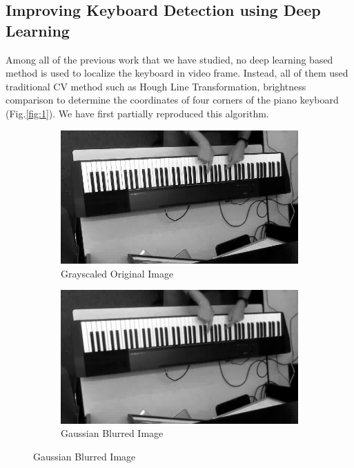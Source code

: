 \documentclass[10pt,twocolumn,letterpaper]{article}
\begin{document}
\subsection{Improving Keyboard Detection using Deep Learning}

Among all of the previous work that we have studied, no deep learning based method is used to localize the keyboard in video frame. Instead, all of them used traditional CV method such as Hough Line Transformation, brightness comparison to determine the coordinates of four corners of the piano keyboard (Fig.\ref{fig:1}). We have first partially reproduced this algorithm.

\begin{figure}[h!]
  \begin{subfigure}{0.23\textwidth}
    \includegraphics[width=\linewidth]{fig/1.jpg}
    \caption{Grayscaled Original Image} \label{fig:a}
  \end{subfigure}\hspace*{\fill}
  \begin{subfigure}{0.23\textwidth}
    \includegraphics[width=\linewidth]{fig/3.jpg}
    \caption{Gaussian Blurred Image} \label{fig:b}
  \end{subfigure}
  

\end{figure}
\end{document}
